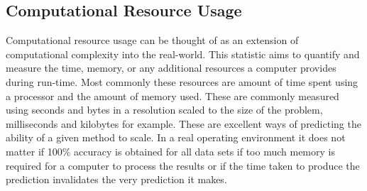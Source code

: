   \subsection{ Computational Resource Usage }
  Computational resource usage can be thought of as an extension of computational
  complexity into the real-world. This statistic aims to quantify and measure
  the time, memory, or any additional resources a computer provides during run-time.
  Most commonly these resources are amount of time spent using a processor
  and the amount of memory used. These are commonly measured using seconds and
  bytes in a resolution scaled to the size of the problem, milliseconds
  and kilobytes for example. These are excellent ways of predicting the ability
  of a given method to scale. In a real operating environment it does not matter
  if 100\% accuracy is obtained for all data sets if too much memory is required
  for a computer to process the results or if the time taken to
  produce the prediction invalidates the very prediction it makes. \\


